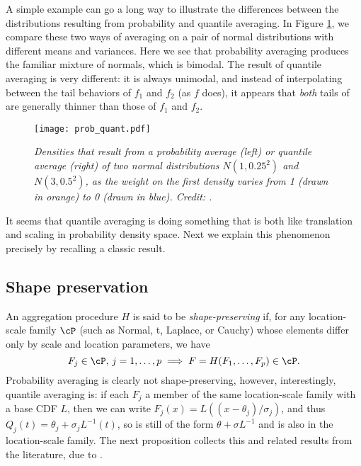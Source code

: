 \documentclass{article}
\begin{document}
A simple example can go a long way to illustrate the differences between the
distributions resulting from probability and quantile averaging. In Figure
\ref{fig:prob_quant}, we compare these two ways of averaging on a pair of
normal distributions with different means and variances.  Here we see that
probability averaging produces the familiar mixture of normals, which is
bimodal. The result of quantile averaging is very different: it is always
unimodal, and instead of interpolating between the tail behaviors of $f_1$ and
$f_2$ (as $f$ does), it appears that \emph{both} tails of  are 
generally thinner than those of $f_1$ and $f_2$.

\begin{figure}[htb]
\centering
\texttt{[image: prob\_quant.pdf]} 
\caption{\it Densities that result from a probability average (left) or quantile
  average (right) of two normal distributions $N(1,0.25^2)$ and $N(3, 0.5^2)$,
  as the weight on the first density varies from 1 (drawn in orange) to 0
  (drawn in blue). Credit: \citet{fakoor2021flexible}.}  
\label{fig:prob_quant}
\end{figure}

It seems that quantile averaging is doing something that is both like
translation and scaling in probability density space. Next we explain this
phenomenon precisely by recalling a classic result.   

\subsection{Shape preservation}

An aggregation procedure $H$ is said to be \emph{shape-preserving} if, for any
location-scale family $\cP$ (such as Normal, t, Laplace, or Cauchy) whose
elements differ only by scale and location parameters, we have     
\[ 
F_j \in \cP, \, j=1,\dots,p \implies F = H(F_1,\dots,F_p) \in \cP.  
\]
Probability averaging is clearly not shape-preserving, however, interestingly,
quantile averaging is: if each $F_j$ a member of the same location-scale family
with a base CDF $L$, then we can write $F_j(x) = L((x-\theta_j)/\sigma_j)$, and  
thus $Q_j(t) = \theta_j + \sigma_j L^{-1}(t)$, so  is still of
the form $\theta + \sigma L^{-1}$ and  is also in the
location-scale family. The next proposition collects this and related results
from the literature, due to \citet{thomas1980appropriate,
  genest1992vincentization}.   
\end{document}
